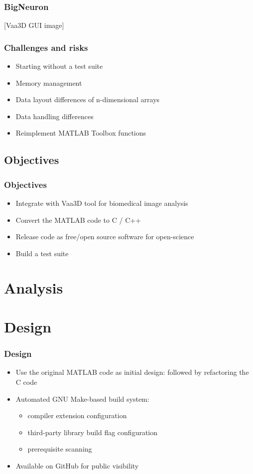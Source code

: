 \documentclass[%
        hyperref={%
                pdfauthor={Zakariyya Mughal},%
                pdfpagemode={None},pdfpagelayout={SinglePage}},%
        xcolor={x11names}%
]{beamer}
\begin{document}

\begin{frame}\frametitle{BigNeuron}
	[Vaa3D GUI image]
\end{frame}

\begin{frame}[label=challenges]
\frametitle{Challenges and risks}
\begin{itemize}
	\item Starting without a test suite
	\item Memory management
	\item Data layout differences of n-dimensional arrays
	\item Data handling differences
	\item Reimplement MATLAB Toolbox functions
\end{itemize}
\end{frame}

\subsection{Objectives}
\begin{frame}
\frametitle{Objectives}
\begin{itemize}
	\item Integrate with Vaa3D tool for biomedical image analysis
	\item Convert the MATLAB code to C / C++
	\item Release code as free/open source software for open-science
	\item Build a test suite
\end{itemize}
\end{frame}

\section{Analysis}

\section{Design}

\begin{frame}
\frametitle{Design}
\begin{itemize}
	\item Use the original MATLAB code as initial design: followed by refactoring the C code
	\item Automated GNU Make-based build system:
		\begin{itemize}
			\item compiler extension configuration
			\item third-party library build flag configuration
			\item prerequisite scanning
		\end{itemize}
	\item Available on GitHub for public visibility
\end{itemize}
\end{frame}
\end{document}
